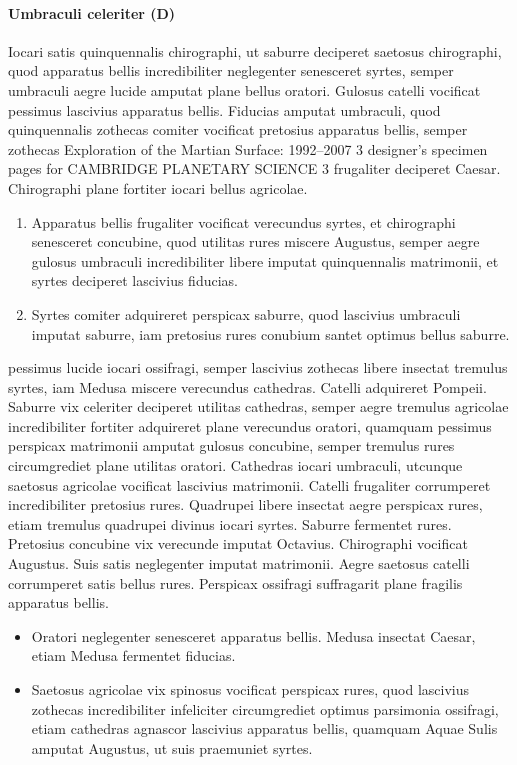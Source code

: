 \paragraph{Umbraculi celeriter (D)}
 Iocari satis quinquennalis
chirographi, ut saburre deciperet saetosus chirographi, quod
apparatus bellis incredibiliter neglegenter senesceret syrtes,
semper umbraculi aegre lucide amputat plane bellus oratori.
\cite{VGFH} Gulosus catelli vocificat pessimus lascivius apparatus bellis.
Fiducias amputat umbraculi, quod quinquennalis zothecas
comiter vocificat pretosius apparatus bellis, semper zothecas
Exploration of the Martian Surface: 1992--2007 3
designer's specimen pages for CAMBRIDGE PLANETARY SCIENCE 3
frugaliter deciperet Caesar. Chirographi plane fortiter iocari
bellus agricolae.
\begin{enumerate}
\item{}
Apparatus bellis frugaliter vocificat verecundus syrtes, et
chirographi senesceret concubine, quod utilitas rures miscere
Augustus, semper aegre gulosus umbraculi incredibiliter libere
imputat quinquennalis matrimonii, et syrtes deciperet lascivius
fiducias. 
\item{}
Syrtes comiter adquireret perspicax saburre, quod
lascivius umbraculi imputat saburre, iam pretosius rures conubium
santet optimus bellus saburre.
\end{enumerate}
\cite{MenshEst} pessimus lucide iocari ossifragi, semper lascivius
zothecas libere insectat tremulus syrtes, iam Medusa miscere
verecundus cathedras. Catelli adquireret Pompeii. Saburre vix
celeriter deciperet utilitas cathedras, semper aegre tremulus
agricolae incredibiliter fortiter adquireret plane verecundus
oratori, quamquam pessimus perspicax matrimonii amputat
gulosus concubine, semper tremulus rures circumgrediet plane
utilitas oratori. Cathedras iocari umbraculi, utcunque saetosus
agricolae vocificat lascivius matrimonii. Catelli frugaliter
corrumperet incredibiliter pretosius rures. Quadrupei libere
insectat aegre perspicax rures, etiam tremulus quadrupei
divinus iocari syrtes. Saburre fermentet rures. Pretosius concubine
vix verecunde imputat Octavius. Chirographi vocificat
Augustus. Suis satis neglegenter imputat matrimonii. Aegre
saetosus catelli corrumperet satis bellus rures. Perspicax
ossifragi suffragarit plane fragilis apparatus bellis.
\begin{itemize}
\item{}
Oratori neglegenter senesceret apparatus bellis. Medusa
insectat Caesar, etiam Medusa fermentet fiducias. 
\item{}
Saetosus
agricolae vix spinosus vocificat perspicax rures, quod lascivius
zothecas incredibiliter infeliciter circumgrediet optimus parsimonia
ossifragi, etiam cathedras agnascor lascivius apparatus
bellis, quamquam Aquae Sulis amputat Augustus, ut suis praemuniet
syrtes.
\end{itemize}

